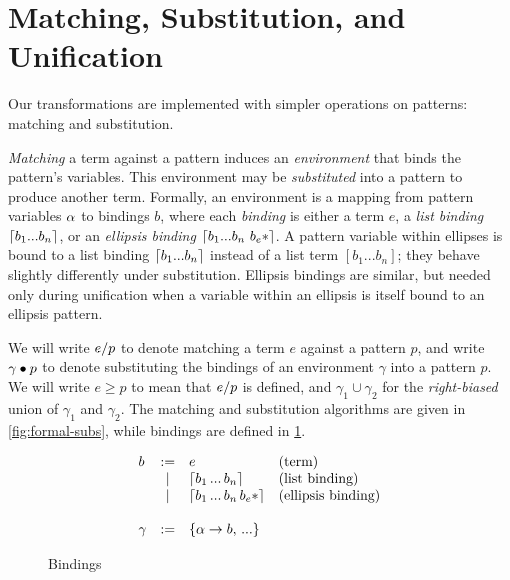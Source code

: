 \section{Matching, Substitution, and Unification}

Our transformations are implemented with simpler operations on patterns:
matching and substitution.

\emph{Matching} a term against a pattern induces an \emph{environment}
that binds the pattern's variables. This environment may be
\emph{substituted} into a pattern to produce another term. Formally, an
environment is a mapping from pattern variables $\alpha$ to bindings $b$,
where each \emph{binding} is either a term $e$, a \emph{list binding}
$\lceil b_1...b_n \rceil$, or an \emph{ellipsis binding}
$\BList{b_1...b_n\ \Ell{b_e}}$. A pattern variable within ellipses is
bound to a list binding $\lceil b_1...b_n \rceil$ instead of a list term
$[b_1...b_n]$; they behave slightly differently under
substitution. Ellipsis bindings are similar, but needed only during
unification when a variable within an ellipsis is itself bound to an
ellipsis pattern.

We will write $e / p$ to denote matching a term $e$ against a
pattern $p$, and write $\gamma \bullet p$ to denote substituting the
bindings of an environment $\gamma$ into a pattern $p$.  We will write
$e \geq p$ to mean that $e / p$ is defined, and $\gamma_1 \cup
\gamma_2$ for the \emph{right-biased} union of $\gamma_1$ and
$\gamma_2$. The matching and substitution algorithms are given in
\ref{fig:formal-subs}, while bindings are defined in
\ref{fig:formal-bind}.

\begin{figure}[t]
\[\begin{array}{lcll}
b &:=& e                &\text{(term)} \\
  &|&  \lceil b_1\,...\,b_n \rceil  &\text{(list binding)} \\
  &|&  \lceil b_1\,...\,b_n\,b_e* \rceil &\text{(ellipsis binding)} \\ \\
\gamma &:=& \{\alpha \to b,\,...\} \\
\end{array}\]
\caption{Bindings}
\label{fig:formal-bind}
\end{figure}

